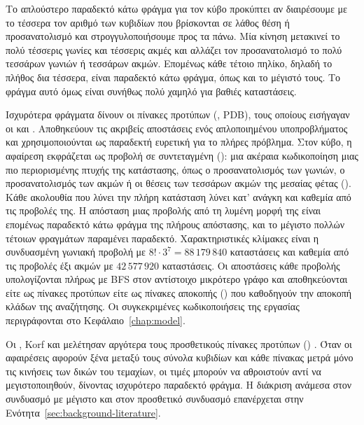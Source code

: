 Το απλούστερο παραδεκτό κάτω φράγμα για τον κύβο προκύπτει αν διαιρέσουμε με το τέσσερα τον αριθμό των κυβιδίων που βρίσκονται σε λάθος θέση ή προσανατολισμό και στρογγυλοποιήσουμε προς τα πάνω. Μία κίνηση μετακινεί το πολύ τέσσερις γωνίες και τέσσερις ακμές και αλλάζει τον προσανατολισμό το πολύ τεσσάρων γωνιών ή τεσσάρων ακμών. Επομένως κάθε τέτοιο πηλίκο, δηλαδή το πλήθος δια τέσσερα, είναι παραδεκτό κάτω φράγμα, όπως και το μέγιστό τους. Το φράγμα αυτό όμως είναι συνήθως πολύ χαμηλό για βαθιές καταστάσεις.

Ισχυρότερα φράγματα δίνουν οι πίνακες προτύπων (, PDB), τους οποίους εισήγαγαν οι  και  \cite{culberson1996pdb}. Αποθηκεύουν τις ακριβείς αποστάσεις ενός απλοποιημένου υποπροβλήματος και χρησιμοποιούνται ως παραδεκτή ευρετική για το πλήρες πρόβλημα. Στον κύβο, η αφαίρεση εκφράζεται ως προβολή σε συντεταγμένη (): μια ακέραια κωδικοποίηση μιας πιο περιορισμένης πτυχής της κατάστασης, όπως ο προσανατολισμός των γωνιών, ο προσανατολισμός των ακμών ή οι θέσεις των τεσσάρων ακμών της μεσαίας φέτας (). Κάθε ακολουθία που λύνει την πλήρη κατάσταση λύνει κατ' ανάγκη και καθεμία από τις προβολές της. Η απόσταση μιας προβολής από τη λυμένη μορφή της είναι επομένως παραδεκτό κάτω φράγμα της πλήρους απόστασης, και το μέγιστο πολλών τέτοιων φραγμάτων παραμένει παραδεκτό. Χαρακτηριστικές κλίμακες είναι η συνδυασμένη γωνιακή προβολή με \(8!\cdot3^{7}=88\,179\,840\) καταστάσεις και καθεμία από τις προβολές έξι ακμών με \(42\,577\,920\) καταστάσεις. Οι αποστάσεις κάθε προβολής υπολογίζονται πλήρως με BFS στον αντίστοιχο μικρότερο γράφο και αποθηκεύονται είτε ως πίνακες προτύπων είτε ως πίνακες αποκοπής () που καθοδηγούν την αποκοπή κλάδων της αναζήτησης. Οι συγκεκριμένες κωδικοποιήσεις της εργασίας περιγράφονται στο Κεφάλαιο~\ref{chap:model}.

Οι , Korf και  μελέτησαν αργότερα τους προσθετικούς πίνακες προτύπων () \cite{felner2004additivePDB}. Όταν οι αφαιρέσεις αφορούν ξένα μεταξύ τους σύνολα κυβιδίων και κάθε πίνακας μετρά μόνο τις κινήσεις των δικών του τεμαχίων, οι τιμές μπορούν να αθροιστούν αντί να μεγιστοποιηθούν, δίνοντας ισχυρότερο παραδεκτό φράγμα. Η διάκριση ανάμεσα στον συνδυασμό με μέγιστο και στον προσθετικό συνδυασμό επανέρχεται στην Ενότητα~\ref{sec:background-literature}.

